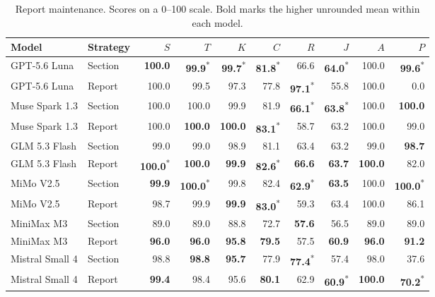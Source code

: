 \begin{table}[t]
\centering\small
\setlength{\tabcolsep}{4pt}
\caption{Report maintenance. Scores on a 0--100 scale. Bold marks the higher unrounded mean within each model.}
\label{tab:rq1c}
\begin{tabular}{llrrrrrrrr}
\toprule
Model & Strategy & $S$ & $T$ & $K$ & $C$ & $R$ & $J$ & $A$ & $P$ \\
\midrule
GPT-5.6 Luna & Section & \textbf{100.0} & \textbf{99.9}\textsuperscript{*} & \textbf{99.7}\textsuperscript{*} & \textbf{81.8}\textsuperscript{*} & 66.6 & \textbf{64.0}\textsuperscript{*} & 100.0 & \textbf{99.6}\textsuperscript{*} \\
GPT-5.6 Luna & Report & 100.0 & 99.5 & 97.3 & 77.8 & \textbf{97.1}\textsuperscript{*} & 55.8 & 100.0 & 0.0 \\
\addlinespace[2pt]
Muse Spark 1.3 & Section & 100.0 & 100.0 & 99.9 & 81.9 & \textbf{66.1}\textsuperscript{*} & \textbf{63.8}\textsuperscript{*} & 100.0 & \textbf{100.0} \\
Muse Spark 1.3 & Report & 100.0 & \textbf{100.0} & \textbf{100.0} & \textbf{83.1}\textsuperscript{*} & 58.7 & 63.2 & 100.0 & 99.0 \\
\addlinespace[2pt]
GLM 5.3 Flash & Section & 99.0 & 99.0 & 98.9 & 81.1 & 63.4 & 63.2 & 99.0 & \textbf{98.7} \\
GLM 5.3 Flash & Report & \textbf{100.0}\textsuperscript{*} & \textbf{100.0} & \textbf{99.9} & \textbf{82.6}\textsuperscript{*} & \textbf{66.6} & \textbf{63.7} & \textbf{100.0} & 82.0 \\
\addlinespace[2pt]
MiMo V2.5 & Section & \textbf{99.9} & \textbf{100.0}\textsuperscript{*} & 99.8 & 82.4 & \textbf{62.9}\textsuperscript{*} & \textbf{63.5} & 100.0 & \textbf{100.0}\textsuperscript{*} \\
MiMo V2.5 & Report & 98.7 & 99.9 & \textbf{99.9} & \textbf{83.0}\textsuperscript{*} & 59.3 & 63.4 & 100.0 & 86.1 \\
\addlinespace[2pt]
MiniMax M3 & Section & 89.0 & 89.0 & 88.8 & 72.7 & \textbf{57.6} & 56.5 & 89.0 & 89.0 \\
MiniMax M3 & Report & \textbf{96.0} & \textbf{96.0} & \textbf{95.8} & \textbf{79.5} & 57.5 & \textbf{60.9} & \textbf{96.0} & \textbf{91.2} \\
\addlinespace[2pt]
Mistral Small 4 & Section & 98.8 & \textbf{98.8} & \textbf{95.7} & 77.9 & \textbf{77.4}\textsuperscript{*} & 57.4 & 98.0 & 37.6 \\
Mistral Small 4 & Report & \textbf{99.4} & 98.4 & 95.6 & \textbf{80.1} & 62.9 & \textbf{60.9}\textsuperscript{*} & \textbf{100.0} & \textbf{70.2}\textsuperscript{*} \\

\end{tabular}
\end{table}
